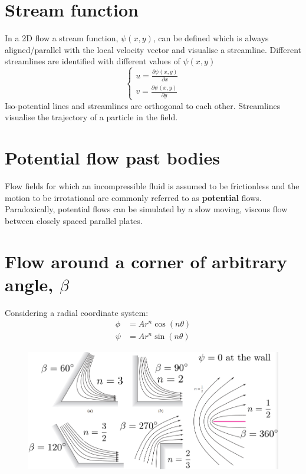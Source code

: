 \documentclass[class=report, crop=false, 12pt,a4paper]{standalone}
\begin{document}
\section{Stream function}
In a 2D flow a stream function, $\psi(x, y)$, can be defined which is always aligned/parallel with the local velocity vector and visualise a streamline. Different streamlines are identified with different values of $\psi (x,y)$
\begin{equation}
  \begin{cases}
    u = \frac{\partial \psi(x,y)}{\partial x}\\
    v = \frac{\partial \psi(x,y)}{\partial y}
  \end{cases}
\end{equation}
Iso-potential lines and streamlines are orthogonal to each other. Streamlines visualise the trajectory of a particle in the field.
\section{Potential flow past bodies}
Flow fields for which an incompressible fluid is assumed to be frictionless and the motion to be irrotational are commonly referred to as \textbf{potential} flows. Paradoxically, potential flows can be simulated by a slow moving, viscous flow between closely spaced parallel plates.
\section{Flow around a corner of arbitrary angle, $\beta$}
Considering a radial coordinate system:
\begin{align}
  \phi &= A r^n \cos(n\theta)\\
  \psi &= Ar^n \sin(n\theta)
\end{align}
\begin{figure}[H]
  \centering
  \includegraphics[width = 0.8 \textwidth]{../img/diagram15.png}
\end{figure}
\end{document}
